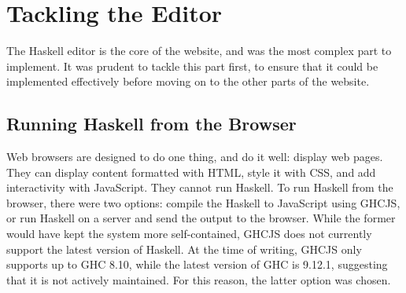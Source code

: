 \documentclass[../main.tex]{subfiles}
\begin{document}

    \section{Tackling the Editor}
        The Haskell editor is the core of the website, and was the most complex part to
            implement.
        It was prudent to tackle this part first, to ensure that it could be
            implemented effectively before moving on to the other parts of the website.

        \subsection{Running Haskell from the Browser}
            Web browsers are designed to do one thing, and do it well: display web pages.
            They can display content formatted with HTML, style it with CSS, and add
                interactivity with JavaScript.
            They cannot run Haskell.
            To run Haskell from the browser, there were two options: compile the Haskell to
                JavaScript using GHCJS, or run Haskell on a server and send the output to the
                browser.
            While the former would have kept the system more self-contained, GHCJS does not
                currently support the latest version of Haskell.
            At the time of writing, GHCJS only supports up to GHC 8.10, while the latest
                version of GHC is 9.12.1, suggesting that it is not actively maintained.
            For this reason, the latter option was chosen.
\end{document}
